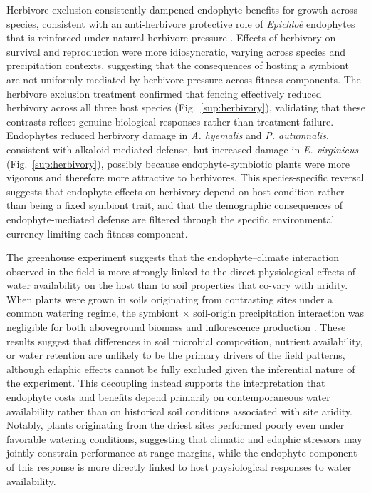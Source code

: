 \documentclass[12pt]{article}\usepackage[]{graphicx}\usepackage[dvipsnames]{xcolor}
\begin{document}
Herbivore exclusion consistently dampened endophyte benefits for growth across species, consistent with an anti-herbivore protective role of \textit{Epichloë} endophytes that is reinforced under natural herbivore pressure \citep{clay1988fungal, decunta2021systematic}. 
Effects of herbivory on survival and reproduction were more idiosyncratic, varying across species and precipitation contexts, suggesting that the consequences of hosting a symbiont are not uniformly mediated by herbivore pressure across fitness components. 
The herbivore exclusion treatment confirmed that fencing effectively reduced herbivory across all three host species (Fig.~\ref{sup:herbivory}), validating that these contrasts reflect genuine biological responses rather than treatment failure. 
Endophytes reduced herbivory damage in \textit{A. hyemalis} and \textit{P. autumnalis}, consistent with alkaloid-mediated defense, but increased damage in \textit{E. virginicus} (Fig.~\ref{sup:herbivory}), possibly because endophyte-symbiotic plants were more vigorous and therefore more attractive to herbivores. 
This species-specific reversal suggests that endophyte effects on herbivory depend on host condition rather than being a fixed symbiont trait, and that the demographic consequences of endophyte-mediated defense are filtered through the specific environmental currency limiting each fitness component.

The greenhouse experiment suggests that the endophyte--climate interaction observed in the field is more strongly linked to the direct physiological effects of water availability on the host than to soil properties that co-vary with aridity. 
When plants were grown in soils originating from contrasting sites under a common watering regime, the symbiont $\times$ soil-origin precipitation interaction was negligible for both aboveground biomass and inflorescence production \citep{van2013plant}. 
These results suggest that differences in soil microbial composition, nutrient availability, or water retention are unlikely to be the primary drivers of the field patterns, although edaphic effects cannot be fully excluded given the inferential nature of the experiment. 
This decoupling instead supports the interpretation that endophyte costs and benefits depend primarily on contemporaneous water availability rather than on historical soil conditions associated with site aridity. 
Notably, plants originating from the driest sites performed poorly even under favorable watering conditions, suggesting that climatic and edaphic stressors may jointly constrain performance at range margins, while the endophyte component of this response is more directly linked to host physiological responses to water availability.
\end{document}
